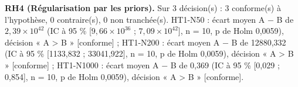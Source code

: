 \textbf{RH4 (Régularisation par les priors).} Sur 3 décision(s) : 3 conforme(s) à l'hypothèse, 0 contraire(s), 0 non tranchée(s). HT1-N50 : écart moyen A $-$ B de $2{,}39 \times 10^{42}$ (IC à 95 \% [$9{,}66 \times 10^{36}$ ; $7{,}09 \times 10^{42}$], n = 10, p de Holm 0,0059), décision « A > B » [conforme] ; HT1-N200 : écart moyen A $-$ B de 12880,332 (IC à 95 \% [1133,832 ; 33041,922], n = 10, p de Holm 0,0059), décision « A > B » [conforme] ; HT1-N1000 : écart moyen A $-$ B de 0,369 (IC à 95 \% [0,029 ; 0,854], n = 10, p de Holm 0,0059), décision « A > B » [conforme].
